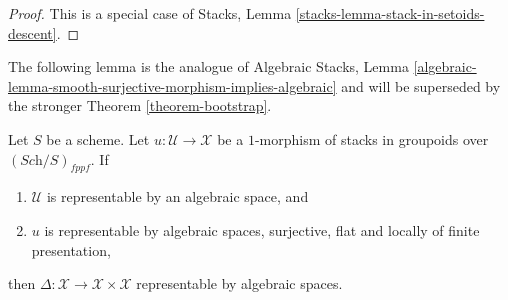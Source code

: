 \begin{proof}
This is a special case of
Stacks, Lemma \ref{stacks-lemma-stack-in-setoids-descent}.
\end{proof}

\noindent
The following lemma is the analogue of
Algebraic Stacks, Lemma
\ref{algebraic-lemma-smooth-surjective-morphism-implies-algebraic}
and will be superseded by the stronger
Theorem \ref{theorem-bootstrap}.

\begin{lemma}
\label{lemma-flat-finite-presentation-surjective-diagonal}
Let $S$ be a scheme.
Let $u : \mathcal{U} \to \mathcal{X}$ be a $1$-morphism of
stacks in groupoids over $(\textit{Sch}/S)_{fppf}$. If
\begin{enumerate}
\item $\mathcal{U}$ is representable by an algebraic space, and
\item $u$ is representable by algebraic spaces, surjective, flat and
locally of finite presentation,
\end{enumerate}
then
$\Delta : \mathcal{X} \to \mathcal{X} \times \mathcal{X}$
representable by algebraic spaces.
\end{lemma}

